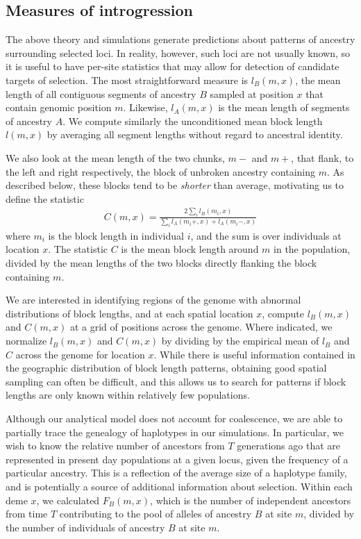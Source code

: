 \documentclass[11pt,letterpaper]{article}
\begin{document}
\subsection*{Measures of introgression}


The above theory and simulations generate predictions about patterns of ancestry surrounding selected loci. 
In reality, however, such loci are not usually known, so it is useful to have per-site statistics that may allow for detection of candidate targets of selection. 
The most straightforward measure is $l_B(m,x)$,  
the mean length of all contiguous segments of ancestry $B$ sampled at position $x$ that contain genomic position $m$.
Likewise, $l_A(m,x)$ is the mean length of segments of ancestry $A$.
We compute similarly the unconditioned mean block length $l(m,x)$
by averaging all segment lengths without regard to ancestral identity.

We also look at the mean length of the two chunks, $m-$ and $m+$, that flank, to the left and right respectively, 
the block of unbroken ancestry containing $m$. 
As described below, these blocks tend to be \emph{shorter} than average,
motivating us to define the statistic
\begin{align*}
     C(m,x) =  \frac{2\sum_i{l_B(m_i,x)}}{\sum_i{l_A(m_i+,x)+l_A(m_i-,x)}}
\end{align*}
where $m_i$ is the block length in individual $i$, and the sum is over individuals at location $x$.
The statistic $C$ is the mean block length around $m$ in the population, 
divided by the mean lengths of the two blocks directly flanking the block containing $m$. 

We are interested in identifying regions of the genome with abnormal distributions of block lengths, 
and at each spatial location $x$, compute $l_B(m,x)$ and $C(m,x)$ at a grid of positions across the genome. 
Where indicated, we normalize $l_B(m,x)$ and $C(m,x)$ by dividing by the empirical mean of $l_B$ and $C$ across the genome for location $x$.
While there is useful information contained in the geographic distribution of block length patterns, 
obtaining good spatial sampling can often be difficult, 
and this allows us to search for patterns if block lengths are only known within relatively few populations. 

Although our analytical model does not account for coalescence, we are able to partially trace the genealogy of haplotypes in our simulations. In particular, we wish to know the relative number of ancestors from $T$ generations ago that are represented in present day populations at a given locus, given the frequency of a particular ancestry. This is a reflection of the average size of a haplotype family, and is potentially a source of additional information about selection. Within each deme $x$, we calculated $F_B(m,x)$, which is the number of independent ancestors from time $T$ contributing to the pool of alleles of ancestry $B$ at site $m$, divided by the number of individuals of ancestry $B$ at site $m$.
\end{document}
